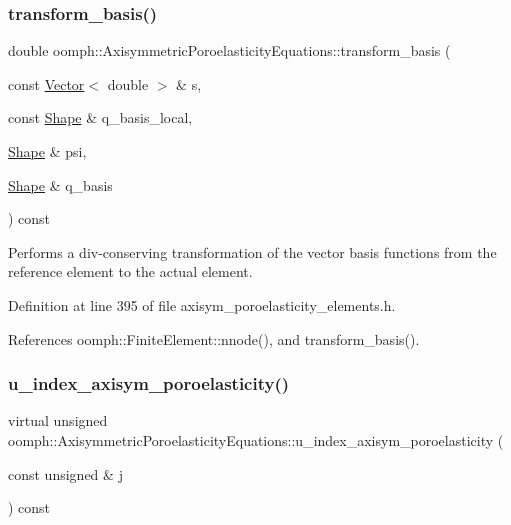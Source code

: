 \subsubsection{\texorpdfstring{transform\+\_\+basis()}{transform\_basis()}\hspace{0.1cm}{\footnotesize\ttfamily [2/2]}}
{\footnotesize\ttfamily double oomph\+::\+Axisymmetric\+Poroelasticity\+Equations\+::transform\+\_\+basis (\begin{DoxyParamCaption}\item[{const \hyperlink{classoomph_1_1Vector}{Vector}$<$ double $>$ \&}]{s,  }\item[{const \hyperlink{classoomph_1_1Shape}{Shape} \&}]{q\+\_\+basis\+\_\+local,  }\item[{\hyperlink{classoomph_1_1Shape}{Shape} \&}]{psi,  }\item[{\hyperlink{classoomph_1_1Shape}{Shape} \&}]{q\+\_\+basis }\end{DoxyParamCaption}) const\hspace{0.3cm}{\ttfamily [inline]}}



Performs a div-\/conserving transformation of the vector basis functions from the reference element to the actual element. 



Definition at line 395 of file axisym\+\_\+poroelasticity\+\_\+elements.\+h.



References oomph\+::\+Finite\+Element\+::nnode(), and transform\+\_\+basis().

\mbox{\label{classoomph_1_1AxisymmetricPoroelasticityEquations_a258196c8f66ba5eec329565fa66dfcc7}} 
\subsubsection{\texorpdfstring{u\+\_\+index\+\_\+axisym\+\_\+poroelasticity()}{u\_index\_axisym\_poroelasticity()}}
{\footnotesize\ttfamily virtual unsigned oomph\+::\+Axisymmetric\+Poroelasticity\+Equations\+::u\+\_\+index\+\_\+axisym\+\_\+poroelasticity (\begin{DoxyParamCaption}\item[{const unsigned \&}]{j }\end{DoxyParamCaption}) const\hspace{0.3cm}{\ttfamily [pure virtual]}}



